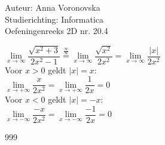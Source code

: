 \documentclass[a4paper]{article}
\begin{document}
  
\noindent \large Auteur: Anna Voronovska \\
\noindent \large Studierichting: Informatica\\
\noindent \large Oefeningenreeks 2D nr. 20.4\\

\medskip

\normalsize

$\lim\limits_{x \to \infty} \dfrac{\sqrt{x^2+3}}{2x^2-1} \stackrel{\tfrac{\infty}{\infty}}{=} \lim\limits_{x \to \infty} \dfrac{\sqrt{x^2}}{2x^2} = \lim\limits_{x \to \infty} \dfrac{|x|}{2x^2}$ \\

Voor $x > 0$ geldt $|x| = x$: \\

$\lim\limits_{x \to +\infty} \dfrac{x}{2x^2} = \lim\limits_{x \to +\infty} \dfrac{1}{2x} = 0$ \\

Voor $x < 0$ geldt $|x| = -x$: \\

$\lim\limits_{x \to -\infty} \dfrac{-x}{2x^2} = \lim\limits_{x \to -\infty} \dfrac{-1}{2x} = 0$ \\

\begin{thebibliography}{999}
\end{thebibliography}
\end{document}
